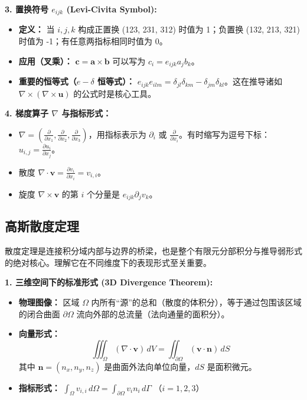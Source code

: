 \documentclass[11pt, a4paper, UTF8]{ctexart}
\begin{document}
\textbf{3. 置换符号 $e_{ijk}$ (Levi-Civita Symbol):}
\begin{itemize}
    \item \textbf{定义：} 当 $i,j,k$ 构成正置换 (123, 231, 312) 时值为 1；负置换 (132, 213, 321) 时值为 -1；有任意两指标相同时值为 0。
    \item \textbf{应用（叉乘）：} $\bm{c} = \bm{a} \times \bm{b}$ 可以写为 $c_i = e_{ijk} a_j b_k$。
    \item \textbf{重要的恒等式（$e-\delta$ 恒等式）：} $e_{ijk} e_{ilm} = \delta_{jl}\delta_{km} - \delta_{jm}\delta_{kl}$。这在推导诸如 $\nabla \times (\nabla \times \bm{u})$ 的公式时是核心工具。
\end{itemize}

\textbf{4. 梯度算子 $\nabla$ 与指标形式：}
\begin{itemize}
    \item $\nabla = \left( \frac{\partial}{\partial x_1}, \frac{\partial}{\partial x_2}, \frac{\partial}{\partial x_3} \right)$，用指标表示为 $\partial_i$ 或 $\frac{\partial}{\partial x_i}$。有时缩写为逗号下标：$u_{i,j} = \frac{\partial u_i}{\partial x_j}$。
    \item 散度 $\nabla \cdot \bm{v} = \frac{\partial v_i}{\partial x_i} = v_{i,i}$。
    \item 旋度 $\nabla \times \bm{v}$ 的第 $i$ 个分量是 $e_{ijk} \partial_j v_k$。
\end{itemize}

\subsection{高斯散度定理}
散度定理是连接积分域内部与边界的桥梁，也是整个有限元分部积分与推导弱形式的绝对核心。理解它在不同维度下的表现形式至关重要。

\textbf{1. 三维空间下的标准形式 (3D Divergence Theorem):}
\begin{itemize}
    \item \textbf{物理图像：} 区域 $\Omega$ 内所有“源”的总和（散度的体积分），等于通过包围该区域的闭合曲面 $\partial\Omega$ 流向外部的总流量（法向通量的面积分）。
    \item \textbf{向量形式：} 
    \[ \iiint_{\Omega} (\nabla \cdot \bm{v}) \, dV = \iint_{\partial\Omega} (\bm{v} \cdot \bm{n}) \, dS \]
    其中 $\bm{n} = (n_x, n_y, n_z)$ 是曲面外法向单位向量，$dS$ 是面积微元。
    \item \textbf{指标形式：} $\int_{\Omega} v_{i,i} \, d\Omega = \int_{\partial\Omega} v_i n_i \, d\Gamma$ （$i=1,2,3$）
\end{itemize}
\end{document}
